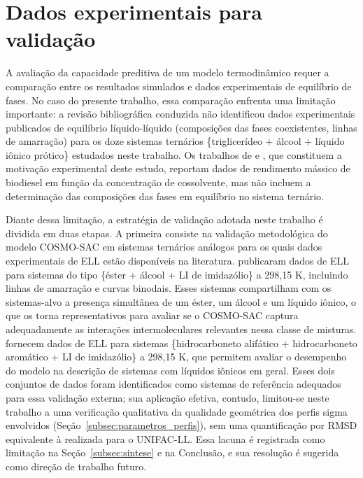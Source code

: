 \section{Dados experimentais para validação}
\label{sec:dados_validacao}

A avaliação da capacidade preditiva de um modelo termodinâmico requer a comparação entre os resultados simulados e dados experimentais de equilíbrio de fases. No caso do presente trabalho, essa comparação enfrenta uma limitação importante: a revisão bibliográfica conduzida não identificou dados experimentais publicados de equilíbrio líquido-líquido (composições das fases coexistentes, linhas de amarração) para os doze sistemas ternários \{triglicerídeo + álcool + líquido iônico prótico\} estudados neste trabalho. Os trabalhos de  e , que constituem a motivação experimental deste estudo, reportam dados de rendimento mássico de biodiesel em função da concentração de cossolvente, mas não incluem a determinação das composições das fases em equilíbrio no sistema ternário.

Diante dessa limitação, a estratégia de validação adotada neste trabalho é dividida em duas etapas. A primeira consiste na validação metodológica do modelo COSMO-SAC em sistemas ternários análogos para os quais dados experimentais de ELL estão disponíveis na literatura.
 publicaram dados de ELL para sistemas do tipo \{éster + álcool + LI de imidazólio\} a 298,15 K, incluindo linhas de amarração e curvas binodais. Esses sistemas compartilham com os sistemas-alvo a presença simultânea de um éster, um álcool e um líquido iônico, o que os torna representativos para avaliar se o COSMO-SAC captura adequadamente as interações intermoleculares relevantes nessa classe de misturas.  fornecem dados de ELL para sistemas \{hidrocarboneto alifático + hidrocarboneto aromático + LI de imidazólio\} a 298,15 K, que permitem avaliar o desempenho do modelo na descrição de sistemas com líquidos iônicos em geral. Esses dois conjuntos de dados foram identificados como sistemas de referência adequados para essa validação externa; sua aplicação efetiva, contudo, limitou-se neste trabalho a uma verificação qualitativa da qualidade geométrica dos perfis sigma envolvidos (Seção~\ref{subsec:parametros_perfis}), sem uma quantificação por RMSD equivalente à realizada para o UNIFAC-LL. Essa lacuna é registrada como limitação na Seção~\ref{subsec:sintese} e na Conclusão, e sua resolução é sugerida como direção de trabalho futuro.

